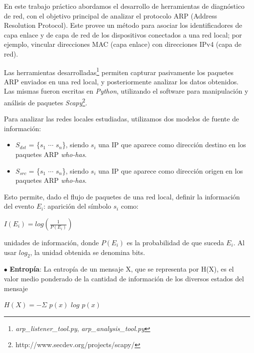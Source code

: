 En este trabajo práctico abordamos el desarrollo de herramientas de diagnóstico de red, con el objetivo principal de analizar el protocolo ARP (Address Resolution Protocol). Este provee un método para asociar los identificadores de capa enlace y de capa de red de los dispositivos conectados a una red local; por ejemplo, vincular direcciones MAC (capa enlace) con direcciones IPv4 (capa de red).

Las herramientas desarrolladas\footnote{\emph{arp\_listener\_tool.py}, \emph{arp\_analysis\_tool.py}} permiten capturar pasivamente los paquetes ARP enviados en una red local, y posteriormente analizar los datos obtenidos. Las mismas fueron escritas en \emph{Python}, utilizando el software para manipulación y análisis de paquetes \emph{Scapy}\footnote{http://www.secdev.org/projects/scapy/}.

Para analizar las redes locales estudiadas, utilizamos dos modelos de fuente de información:
\vspace*{-2mm}

\begin{itemize}
  \item $S_{dst}$ = \{$s_1$ $\cdots$ $s_n$\}, siendo $s_i$ una IP que aparece como dirección destino en los paquetes ARP \emph{who-has}.
  \item $S_{src}$ = \{$s_1$ $\cdots$ $s_n$\}, siendo $s_i$ una IP que aparece como dirección origen en los paquetes ARP \emph{who-has}.
\end{itemize}

Esto permite, dado el flujo de paquetes de una red local, definir la información del evento $E_i$: aparición del símbolo $s_i$ como:

\begin{center}
$I (E_i) = log(\frac{1}{P(E_i)})$ 
\end{center}

unidades de información, donde $P(E_i)$ es la probabilidad de que suceda $E_i$. Al usar $log_2$, la unidad obtenida se denomina bits.

$\bullet$ \textbf{Entropía}: La entropía de un mensaje X, que se representa por H(X), es el valor medio ponderado de la cantidad de información de los diversos estados del mensaje 

\begin{center}
$H(X) = - \Sigma$ $p(x)$ $log$ $p(x)$
\end{center}

